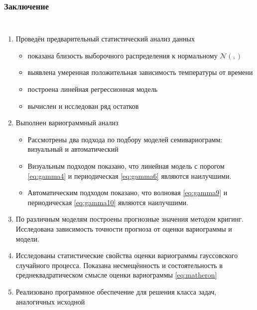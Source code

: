 \documentclass[notheorems]{beamer}
\theoremstyle{definition}
\theoremstyle{example}
\theoremstyle{plain}
\newcommand{\inp}[1]{}
\newcommand{\descriptive}[2]{\inp{#1/descriptive/#2}}
\newcommand{\normaldistr}{$\mathcal{N}(\descriptive{original}{mean}, \descriptive{original}{variance})$}
\begin{document}
\begin{frame}
  \frametitle{Заключение}
  \setlength{\itemindent}{-.5in}
  \begin{columns}
  \column{6.2in}
  \vspace{-9pt}
  \begin{enumerate}
    \item Проведён предварительный статистический анализ данных
      \begin{itemize}
        \item показана близость выборочного распределения к нормальному \normaldistr
        \item выявлена умеренная положительная зависимость температуры от времени
        \item построена линейная регрессионная модель
        \item вычислен и исследован ряд остатков
      \end{itemize}
    \item Выполнен вариограммный анализ
      \begin{itemize}
        \item Рассмотрены два подхода по подбору моделей семивариограмм: \small{визуальный и автоматический}
        \item Визуальным подходом показано, что линейная модель с порогом \eqref{eq:gamma4} и периодическая \eqref{eq:gamma6} являются наилучшими.
        \item Автоматическим подходом показано, что волновая \eqref{eq:gamma9} и периодическая \eqref{eq:gamma10} являются наилучшими.
      \end{itemize}
    \item По различным моделям построены прогнозные значения методом кригинг. Исследована зависимость точности прогноза от оценки вариограммы и модели.
    \item Исследованы статистические свойства оценки вариограммы гауссовского случайного процесса. Показана несмещённость и состоятельность в среднеквадратическом смысле оценки вариограммы \eqref{eq:matheron}
    \item Реализовано программное обеспечение для решения класса задач, аналогичных исходной
  \end{enumerate}
  \end{columns}
\end{frame}
\end{document}
